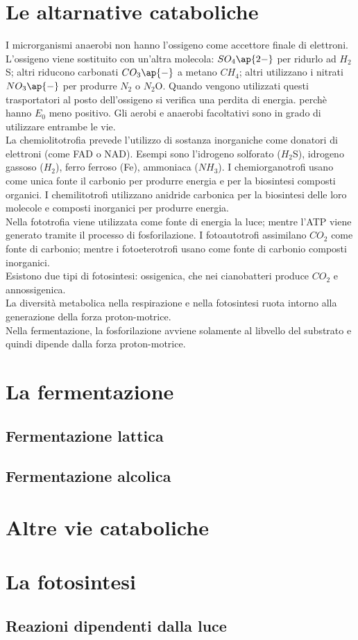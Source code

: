 \section{Le altarnative cataboliche}
I microrganismi anaerobi non hanno l'ossigeno come accettore finale di elettroni. L'ossigeno viene sostituito con un'altra molecola: $SO_4\ap{2-}$ per ridurlo ad $H_2$S; altri riducono carbonati $CO_3\ap{-}$ a metano $CH_4$; altri utilizzano i nitrati $NO_3\ap{-}$ per produrre $N_2$ o $N_2$O. Quando vengono utilizzati questi trasportatori al posto dell'ossigeno si verifica una perdita di energia. perch\`e hanno $E_0$ meno positivo. Gli aerobi e anaerobi facoltativi sono in grado di utilizzare entrambe le vie.
\\La chemiolitotrofia prevede l'utilizzo di sostanza inorganiche come donatori di elettroni (come FAD o NAD). Esempi sono l'idrogeno solforato ($H_2$S), idrogeno gassoso ($H_2$), ferro ferroso (Fe), ammoniaca ($NH_3$). I chemiorganotrofi usano come unica fonte il carbonio per produrre energia e per la biosintesi composti organici. I chemilitotrofi utilizzano anidride carbonica per la biosintesi delle loro molecole e composti inorganici per produrre energia. 
\\Nella fototrofia viene utilizzata come fonte di energia la luce; mentre l'ATP viene generato tramite il processo di fosforilazione. I fotoautotrofi assimilano $CO_2$ come fonte di carbonio; mentre i fotoeterotrofi usano come fonte di carbonio composti inorganici. 
\\Esistono due tipi di fotosintesi: ossigenica, che nei cianobatteri produce $CO_2$ e annossigenica.
\\La diversit\`a metabolica nella respirazione e nella fotosintesi ruota intorno alla generazione della forza proton-motrice. \\Nella fermentazione, la fosforilazione avviene solamente al libvello del substrato e quindi dipende dalla forza proton-motrice.
\section{La fermentazione}
\subsection{Fermentazione lattica}
\subsection{Fermentazione alcolica}
\section{Altre vie cataboliche}
\section{La fotosintesi}
\subsection{Reazioni dipendenti dalla luce}
